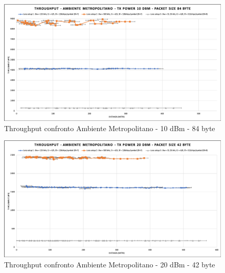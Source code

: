 \documentclass[12pt,a4paper,openright,twoside]{report}
\begin{document}
\begin{figure}[h]                      
\begin{center} 
\includegraphics[width=\textwidth]{THROUGHPUT_confronto_AM_10dBm_84byte.png}
\caption[Throughput confronto Ambiente Metropolitano - 10 dBm - 84 byte]{Throughput confronto Ambiente Metropolitano - 10 dBm - 84 byte}\label{fig:prima}
\end{center}
\end{figure}

\begin{figure}[h]                      
\begin{center} 
\includegraphics[width=\textwidth]{THROUGHPUT_confronto_AM_20dBm_42byte.png}
\caption[Throughput confronto Ambiente Metropolitano - 20 dBm - 42 byte]{Throughput confronto Ambiente Metropolitano - 20 dBm - 42 byte}\label{fig:prima}
\end{center}
\end{figure}
\end{document}
